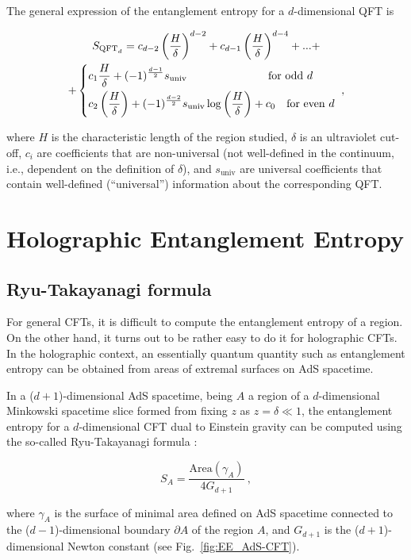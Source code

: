 \documentclass[twocolumn]{revtex4}
\providecommand{\eq}[2]{
    \begin{equation}
        #2
    \label{eq:#1}
    \end{equation}
}
\providecommand{\eqgat}[2]{
    \begin{gather}
        #2
    \label{eq:#1}
    \end{gather}
}
\begin{document}
The general expression of the entanglement entropy for a $d$-dimensional QFT is \cite{nishioka_entanglement_2018}
\eqgat{EE}{
    S_{\text{QFT}_d} = c_{d-2} \left( \frac{H}{\delta} \right) ^{d-2} + c_{d-1} \left( \frac{H}{\delta} \right) ^{d-4} + ... + \nonumber \\
    + \begin{dcases}
        c_1 \frac{H}{\delta} + (-1)^{\frac{d-1}{2}} s_{\text{univ}}
        \qquad \qquad \qquad \quad \ \text{for odd } d \\
        c_2 \left ( \frac{H}{\delta} \right ) + (-1)^{\frac{d-2}{2}} s_{\text{univ}} \log \left ( \frac{H}{\delta} \right ) + c_0
        \quad \text{for even } d
    \end{dcases} \ ,
}
where $H$ is the characteristic length of the region studied, $\delta$ is an ultraviolet cut-off, $c_i$ are coefficients that are non-universal (not well-defined in the continuum, i.e., dependent on the definition of $\delta$), and $s_{\text{univ}}$ are universal coefficients that contain well-defined (``universal'') information about the corresponding QFT.


\section{Holographic Entanglement Entropy} \label{s:EE_Holo}


\subsection{Ryu-Takayanagi formula} \label{ss:R-T}

For general CFTs, it is difficult to compute the entanglement entropy of a region. On the other hand, it turns out to be rather easy to do it for holographic CFTs. In the holographic context, an essentially quantum quantity such as entanglement entropy can be obtained from areas of extremal surfaces on AdS spacetime.

In a ($d+1$)-dimensional AdS spacetime, being $A$ a region of a $d$-dimensional Minkowski spacetime slice formed from fixing $z$ as $z=\delta \ll 1$, the entanglement entropy for a $d$-dimensional CFT dual to Einstein gravity can be computed using the so-called Ryu-Takayanagi formula \cite{ryu_holographic_2008}:
\eq{EE_RT}{
    S_A = \frac{ \text{Area}(\gamma_A) }{ 4 G_{d+1} } \ ,
}
where $\gamma_A$ is the surface of minimal area defined on AdS spacetime connected to the ($d-1$)-dimensional boundary $\partial A$ of the region $A$, and $G_{d+1}$ is the ($d+1$)-dimensional Newton constant (see Fig.~\ref{fig:EE_AdS-CFT}).
\end{document}
